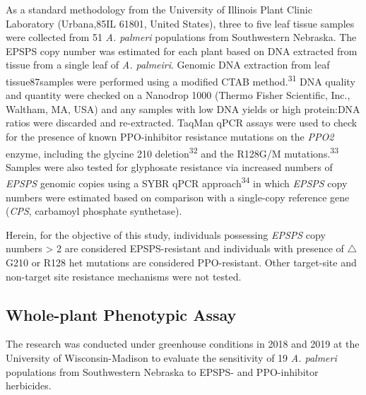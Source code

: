 \documentclass[
  12pt,
  a4paper]{article}
\begin{document}
As a standard methodology from the University of Illinois Plant Clinic
Laboratory (Urbana,85IL 61801, United States), three to five leaf tissue
samples were collected from 51 \emph{A. palmeri} populations from
Southwestern Nebraska. The EPSPS copy number was estimated for each
plant based on DNA extracted from tissue from a single leaf of \emph{A.
palmeiri}. Genomic DNA extraction from leaf tissue87samples were
performed using a modified CTAB method.\textsuperscript{31} DNA quality
and quantity were checked on a Nanodrop 1000 (Thermo Fisher Scientific,
Inc., Waltham, MA, USA) and any samples with low DNA yields or high
protein:DNA ratios were discarded and re-extracted. TaqMan qPCR assays
were used to check for the presence of known PPO-inhibitor resistance
mutations on the \emph{PPO2} enzyme, including the glycine 210
deletion\textsuperscript{32} and the R128G/M
mutations.\textsuperscript{33} Samples were also tested for glyphosate
resistance via increased numbers of \emph{EPSPS} genomic copies using a
SYBR qPCR approach\textsuperscript{34} in which \emph{EPSPS} copy
numbers were estimated based on comparison with a single-copy reference
gene (\emph{CPS}, carbamoyl phosphate synthetase).

Herein, for the objective of this study, individuals possessing
\emph{EPSPS} copy numbers \textgreater{} 2 are considered
EPSPS-resistant and individuals with presence of \(\triangle\)G210 or
R128 het mutations are considered PPO-resistant. Other target-site and
non-target site resistance mechanisms were not tested.

\hypertarget{whole-plant-phenotypic-assay}{%
\subsection{Whole-plant Phenotypic
Assay}\label{whole-plant-phenotypic-assay}}

The research was conducted under greenhouse conditions in 2018 and 2019
at the University of Wisconsin-Madison to evaluate the sensitivity of 19
\emph{A. palmeri} populations from Southwestern Nebraska to EPSPS- and
PPO-inhibitor herbicides.
\end{document}
